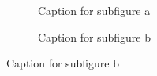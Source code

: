 \begin{refsection}
\begin{figure}[H]
	\centering
	
	\begin{subfigure}[b]{0.40\textwidth}
		\centering
		\caption{Caption for subfigure a}
		\label{fig:firstFig:a}
	\end{subfigure}
	\hfill
	\begin{subfigure}[b]{0.40\textwidth}
		\centering
		\caption{Caption for subfigure b}
		\label{fig:firstFig:b}
	\end{subfigure}
	

\end{figure}
\end{refsection}
